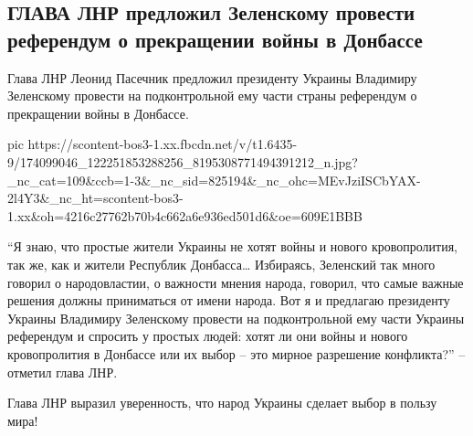  
 
 
 
 

\subsection{ГЛАВА ЛНР предложил Зеленскому провести референдум о прекращении войны в Донбассе}

Глава ЛНР Леонид Пасечник предложил президенту Украины Владимиру Зеленскому
провести на подконтрольной ему части страны референдум о прекращении войны в
Донбассе.


\ifcmt
  pic https://scontent-bos3-1.xx.fbcdn.net/v/t1.6435-9/174099046_122251853288256_8195308771494391212_n.jpg?_nc_cat=109&ccb=1-3&_nc_sid=825194&_nc_ohc=MEvJziISCbYAX-2l4Y3&_nc_ht=scontent-bos3-1.xx&oh=4216c27762b70b4c662a6e936ed501d6&oe=609E1BBB
\fi


\enquote{Я знаю, что простые жители Украины не хотят войны и нового кровопролития, так
же, как и жители Республик Донбасса… Избираясь, Зеленский так много говорил о
народовластии, о важности мнения народа, говорил, что самые важные решения
должны приниматься от имени народа. Вот я и предлагаю президенту Украины
Владимиру Зеленскому провести на подконтрольной ему части Украины референдум и
спросить у простых людей: хотят ли они войны и нового кровопролития в Донбассе
или их выбор – это мирное разрешение конфликта?} – отметил глава ЛНР.  

Глава ЛНР выразил уверенность, что народ Украины сделает выбор в пользу мира!
